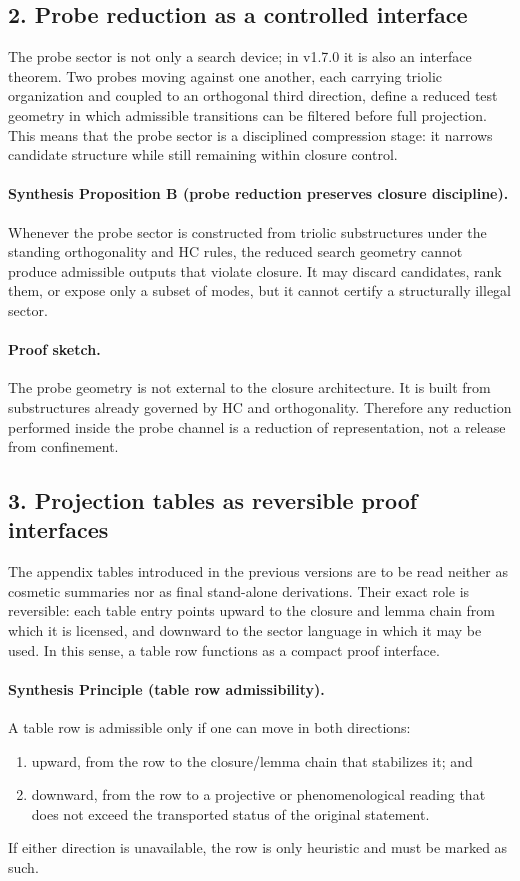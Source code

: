 \subsection*{2. Probe reduction as a controlled interface}
The probe sector is not only a search device; in v1.7.0 it is also an
interface theorem. Two probes moving against one another, each carrying triolic
organization and coupled to an orthogonal third direction, define a reduced test
geometry in which admissible transitions can be filtered before full projection.
This means that the probe sector is a disciplined compression stage: it narrows
candidate structure while still remaining within closure control.

\paragraph{Synthesis Proposition B (probe reduction preserves closure discipline).}
Whenever the probe sector is constructed from triolic substructures under the
standing orthogonality and HC rules, the reduced search geometry cannot produce
admissible outputs that violate closure. It may discard candidates, rank them,
or expose only a subset of modes, but it cannot certify a structurally illegal
sector.

\paragraph{Proof sketch.}
The probe geometry is not external to the closure architecture. It is built from
substructures already governed by HC and orthogonality. Therefore any reduction
performed inside the probe channel is a reduction of representation, not a
release from confinement.

\subsection*{3. Projection tables as reversible proof interfaces}
The appendix tables introduced in the previous versions are to be read neither
as cosmetic summaries nor as final stand-alone derivations. Their exact role is
reversible: each table entry points upward to the closure and lemma chain from
which it is licensed, and downward to the sector language in which it may be
used. In this sense, a table row functions as a compact proof interface.

\paragraph{Synthesis Principle (table row admissibility).}
A table row is admissible only if one can move in both directions:
\begin{enumerate}[leftmargin=2em,label=(\alph*)]
  \item upward, from the row to the closure/lemma chain that stabilizes it; and
  \item downward, from the row to a projective or phenomenological reading that
  does not exceed the transported status of the original statement.
\end{enumerate}
If either direction is unavailable, the row is only heuristic and must be marked
as such.

